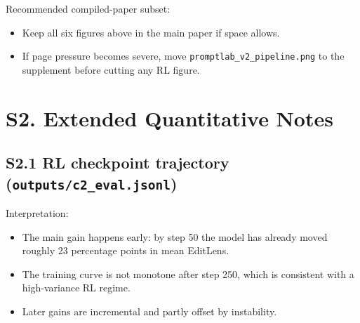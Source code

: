 \documentclass[11pt]{article}
\begin{document}
Recommended compiled-paper subset:

\begin{itemize}
\item Keep all six figures above in the main paper if space allows.
\item If page pressure becomes severe, move \texttt{promptlab\_v2\_pipeline.png} to the supplement before cutting any RL figure.
\end{itemize}

\section*{S2. Extended Quantitative Notes}

\subsection*{S2.1 RL checkpoint trajectory (\texttt{outputs/c2\_eval.jsonl})}

\begin{table}[h]
\centering
\small
{}
\end{table}

Interpretation:

\begin{itemize}
\item The main gain happens early: by step 50 the model has already moved roughly 23 percentage points in mean EditLens.
\item The training curve is not monotone after step 250, which is consistent with a high-variance RL regime.
\item Later gains are incremental and partly offset by instability.
\end{itemize}
\end{document}
